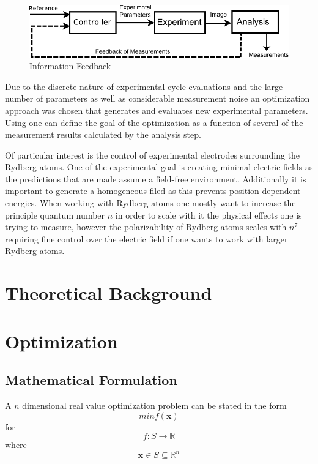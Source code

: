 \documentclass[a4paper,titlepage]{report}
\begin{document}
\begin{figure}[htb]
\centering
\includegraphics{Images/Feedback.pdf}
\caption{Information Feedback}
\label{fig: Information Feedback}
\end{figure}


Due to the discrete nature of experimental cycle evaluations and the large number of parameters as well as considerable measurement noise an optimization approach was chosen that generates and evaluates new experimental parameters. Using one can define the goal of the optimization as a function of several of the measurement results calculated by the analysis step.

Of particular interest is the control of experimental electrodes surrounding the Rydberg atoms. One of the experimental goal is creating minimal electric fields as the predictions that are made assume a field-free environment. Additionally it is important to generate a homogeneous filed as this prevents position dependent energies. When working with Rydberg atoms one mostly want to increase the principle quantum number $n$ in order to scale with it the physical effects one is trying to measure, however the polarizability of Rydberg atoms scales with $n^7$ requiring fine control over the electric field if one wants to work with larger Rydberg atoms.



\chapter{Theoretical Background}

\chapter{Optimization}

\section{Mathematical Formulation}
A $n$ dimensional real value optimization problem can be stated in the form
\[ min f(\mathbf{x})  \]
for
\[ f: S \rightarrow  \mathbb{R} \]
where
\[ \mathbf{x} \in S  \subseteq \mathbb{R}^n \]
\end{document}
